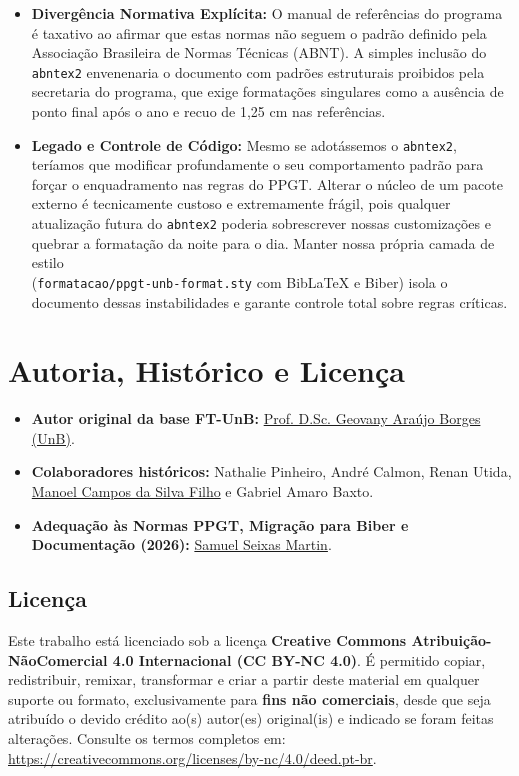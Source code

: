 \documentclass[12pt, a4paper]{article}
\begin{document}
\begin{itemize}
    \item \textbf{Divergência Normativa Explícita:} O manual de referências do programa é taxativo ao afirmar que estas normas não seguem o padrão definido pela Associação Brasileira de Normas Técnicas (ABNT). A simples inclusão do \texttt{abntex2} envenenaria o documento com padrões estruturais proibidos pela secretaria do programa, que exige formatações singulares como a ausência de ponto final após o ano e recuo de 1,25 cm nas referências.
    \item \textbf{Legado e Controle de Código:} Mesmo se adotássemos o \texttt{abntex2}, teríamos que modificar profundamente o seu comportamento padrão para forçar o enquadramento nas regras do PPGT. Alterar o núcleo de um pacote externo é tecnicamente custoso e extremamente frágil, pois qualquer atualização futura do \texttt{abntex2} poderia sobrescrever nossas customizações e quebrar a formatação da noite para o dia. Manter nossa própria camada de estilo \\ (\texttt{formatacao/ppgt-unb-format.sty} com BibLaTeX e Biber) isola o documento dessas instabilidades e garante controle total sobre regras críticas.
\end{itemize}

\section{Autoria, Histórico e Licença}

\begin{itemize}
    \item \textbf{Autor original da base FT-UnB:} \href{https://lara.unb.br/~gaborges/}{Prof. D.Sc. Geovany Araújo Borges (UnB)}.
    \item \textbf{Colaboradores históricos:} Nathalie Pinheiro, André Calmon, Renan Utida, \href{https://github.com/manoelcampos}{Manoel Campos da Silva Filho} e Gabriel Amaro Baxto.
    \item \textbf{Adequação às Normas PPGT, Migração para Biber e Documentação (2026):} \href{https://github.com/zaymuel}{Samuel Seixas Martin}.
\end{itemize}

\subsection*{Licença}
Este trabalho está licenciado sob a licença \textbf{Creative Commons Atribuição-NãoComercial 4.0 Internacional (CC BY-NC 4.0)}. É permitido copiar, redistribuir, remixar, transformar e criar a partir deste material em qualquer suporte ou formato, exclusivamente para \textbf{fins não comerciais}, desde que seja atribuído o devido crédito ao(s) autor(es) original(is) e indicado se foram feitas alterações. Consulte os termos completos em: \url{https://creativecommons.org/licenses/by-nc/4.0/deed.pt-br}.
\end{document}
